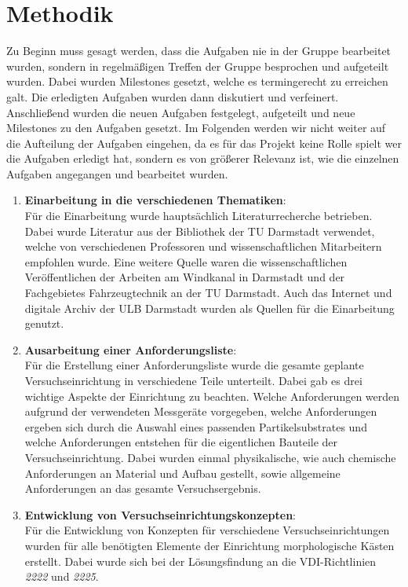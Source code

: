 \section{Methodik}
Zu Beginn muss gesagt werden, dass die Aufgaben nie in der Gruppe bearbeitet wurden, sondern in regelm\"{a}{\ss}igen Treffen der Gruppe besprochen und aufgeteilt wurden. Dabei wurden Milestones gesetzt, welche es termingerecht zu erreichen galt. Die erledigten Aufgaben wurden dann diskutiert und verfeinert. Anschlie{\ss}end wurden die neuen Aufgaben festgelegt, aufgeteilt und neue Milestones zu den Aufgaben gesetzt. Im Folgenden werden wir nicht weiter auf die Aufteilung der Aufgaben eingehen, da es f\"{u}r das Projekt keine Rolle spielt wer die Aufgaben erledigt hat, sondern es von gr\"{o}{\ss}erer Relevanz ist, wie die einzelnen Aufgaben angegangen und bearbeitet wurden.
\begin{enumerate}
\item \textbf{Einarbeitung in die verschiedenen Thematiken}:\\
F\"{u}r die Einarbeitung wurde haupts\"{a}chlich Literaturrecherche betrieben. Dabei wurde Literatur aus der Bibliothek der TU Darmstadt verwendet, welche von verschiedenen Professoren und wissenschaftlichen Mitarbeitern empfohlen wurde. Eine weitere Quelle waren die wissenschaftlichen Ver\"{o}ffentlichen der Arbeiten am Windkanal in Darmstadt und der Fachgebietes Fahrzeugtechnik an der TU Darmstadt. Auch das Internet und digitale Archiv der ULB Darmstadt wurden als Quellen f\"{u}r die Einarbeitung genutzt.
\item \textbf{Ausarbeitung einer Anforderungsliste}:\\
F\"{u}r die Erstellung einer Anforderungsliste wurde die gesamte geplante Versuchseinrichtung in verschiedene Teile unterteilt. Dabei gab es drei wichtige Aspekte der Einrichtung zu beachten. Welche Anforderungen werden aufgrund der verwendeten Messger\"{a}te vorgegeben, welche Anforderungen ergeben sich durch die Auswahl eines passenden Partikelsubstrates und welche Anforderungen entstehen f\"{u}r die eigentlichen Bauteile der Versuchseinrichtung. Dabei wurden einmal physikalische, wie auch chemische Anforderungen an Material und Aufbau gestellt, sowie allgemeine Anforderungen an das gesamte Versuchsergebnis.
\item \textbf{Entwicklung von Versuchseinrichtungskonzepten}:\\
F\"{u}r die Entwicklung von Konzepten f\"{u}r verschiedene Versuchseinrichtungen wurden f\"{u}r alle ben\"{o}tigten Elemente der Einrichtung morphologische K\"{a}sten erstellt. Dabei wurde sich bei der L\"{o}sungsfindung an die VDI-Richtlinien \textit{2222} und \textit{2225}.\\

\end{enumerate}
